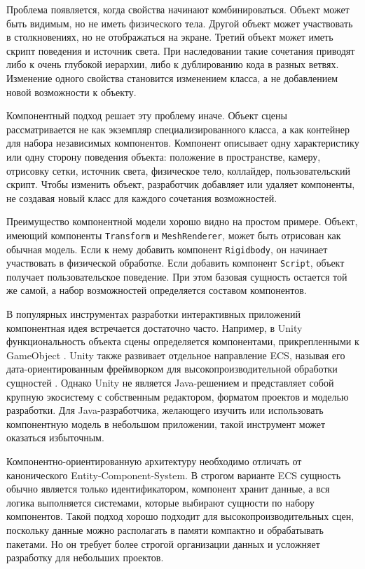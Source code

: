 Проблема появляется, когда свойства начинают комбинироваться. Объект
может быть видимым, но не иметь физического тела. Другой объект может
участвовать в столкновениях, но не отображаться на экране. Третий объект
может иметь скрипт поведения и источник света. При наследовании такие
сочетания приводят либо к очень глубокой иерархии, либо к дублированию
кода в разных ветвях. Изменение одного свойства становится изменением
класса, а не добавлением новой возможности к объекту.

Компонентный подход решает эту проблему иначе. Объект сцены
рассматривается не как экземпляр специализированного класса, а как
контейнер для набора независимых компонентов. Компонент описывает одну
характеристику или одну сторону поведения объекта: положение в
пространстве, камеру, отрисовку сетки, источник света, физическое тело,
коллайдер, пользовательский скрипт. Чтобы изменить объект, разработчик
добавляет или удаляет компоненты, не создавая новый класс для каждого
сочетания возможностей.

Преимущество компонентной модели хорошо видно на простом примере.
Объект, имеющий компоненты \texttt{Transform} и \texttt{MeshRenderer},
может быть отрисован как обычная модель. Если к нему добавить компонент
\texttt{Rigidbody}, он начинает участвовать в физической обработке. Если
добавить компонент \texttt{Script}, объект получает пользовательское
поведение. При этом базовая сущность остается той же самой, а набор
возможностей определяется составом компонентов.

В популярных инструментах разработки интерактивных приложений
компонентная идея встречается достаточно часто. Например, в Unity
функциональность объекта сцены определяется компонентами, прикрепленными
к GameObject \cite{unity-components}. Unity также развивает отдельное
направление ECS, называя его дата-ориентированным фреймворком для
высокопроизводительной обработки сущностей \cite{unity-ecs}. Однако Unity
не является Java-решением и представляет собой крупную экосистему с
собственным редактором, форматом проектов и моделью разработки. Для
Java-разработчика, желающего изучить или использовать компонентную модель
в небольшом приложении, такой инструмент может оказаться избыточным.

Компонентно-ориентированную архитектуру необходимо отличать от
канонического Entity-Component-System. В строгом варианте ECS сущность
обычно является только идентификатором, компонент хранит данные, а вся
логика выполняется системами, которые выбирают сущности по набору
компонентов. Такой подход хорошо подходит для высокопроизводительных
сцен, поскольку данные можно располагать в памяти компактно и обрабатывать
пакетами. Но он требует более строгой организации данных и усложняет
разработку для небольших проектов.

